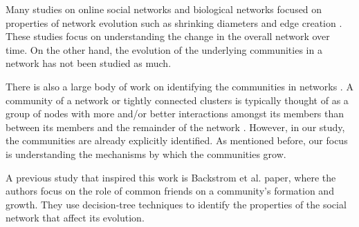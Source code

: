 Many studies on online social networks and biological
networks focused on properties of network evolution such as shrinking 
diameters and edge creation \cite{kumar_tomkins, LKF, micro_evol}.
These studies focus on understanding the change in the overall
network over time. On the other hand, the evolution of the 
underlying communities in a network has not been studied as much. 

There is also a large body of work on identifying the communities in 
networks \cite{newman, danon, www10}.
A community of a network or tightly connected clusters is typically thought of
as a group of nodes with more and/or better interactions amongst
its members than between its members and the remainder of the
network \cite{define_comm}. However, in our study, the communities are 
already explicitly identified. As mentioned before, our focus is understanding 
the mechanisms by which the communities grow.

A previous study that inspired this work is  Backstrom
et al. \cite{group_formation} paper, where the authors focus on the role of common
friends on a community's formation and growth. They use decision-tree techniques
to identify the properties of the social network that affect its evolution.

